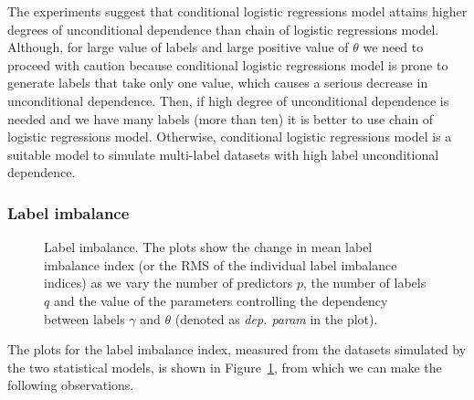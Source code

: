\documentclass[review]{elsarticle}
\begin{document}
		The experiments suggest that conditional logistic regressions model attains higher degrees of unconditional dependence than chain of logistic regressions model. Although, for large value of labels and large positive value of $\theta$ we need to proceed with caution because conditional logistic regressions model is prone to generate labels that take only one value, which causes a serious decrease in unconditional dependence. Then, if high degree of unconditional dependence is needed and we have many labels (more than ten) it is better to use chain of logistic regressions model. Otherwise, conditional logistic regressions model is a suitable model to simulate multi-label datasets with high label unconditional dependence.
		
		\subsubsection{Label imbalance}
		
		\begin{figure}[H]
			\begin{center}
			\end{center}
			\caption{Label imbalance. The plots show the change in mean label imbalance index (or the RMS of the individual label imbalance indices) as we vary the number of predictors $p$, the number of labels $q$ and the value of the parameters controlling the dependency between labels $\gamma$ and $\theta$ (denoted as \emph{dep. param} in the plot).}
			\label{fig:results:imb}
		\end{figure}
		
		The plots for the label imbalance index, measured from the datasets simulated by the two statistical models, is shown in Figure~\ref{fig:results:imb}, from which we can make the following observations.
		
\end{document}
